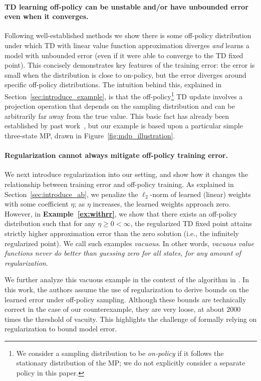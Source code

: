 \paragraph{TD learning off-policy can be unstable and/or have unbounded error even when it converges.}
Following well-established methods we show there is some off-policy distribution under which TD with linear value function approximation diverges \emph{and} learns a model with unbounded error (even if it were able to converge to the TD fixed point). This concisely demonstrates key features of the training error: the error is small when the distribution is close to on-policy, but the error diverges around specific off-policy distributions.  The intuition behind this, explained in Section~\ref{sec:introduce_example}, is that the off-policy\footnote{We consider a sampling distribution to be \emph{on-policy} if it follows the stationary distribution of the MP;  we do not explicitly consider a separate policy in this paper. } TD update involves a projection operation that depends on the sampling distribution and can be arbitrarily far away from the true value.  This basic fact has already been established by past work~\cite{baird1993counterexample,kolter2011fixed}, but our example is based upon a particular simple three-state MP, drawn in Figure~\ref{fig:mdp_illustration}.

\paragraph{Regularization cannot always mitigate off-policy training error. }
We next introduce regularization into our setting, and show how it changes the relationship between training error and off-policy training. As explained in Section~\ref{sec:introduce_ab}, we penalize the $\ell_2$-norm of learned (linear) weights with some coefficient $\eta$; as $\eta$ increases, the learned weights approach zero.  However, in \textbf{Example~\ref{ex:withrr}}, we show that there exists an off-policy distribution such that for any $\eta \geq 0 < \infty$, the regularized TD fixed point attains strictly higher approximation error than the zero solution (i.e., the infinitely regularized point).  We call such examples \emph{vacuous}. In other words, \emph{vacuous value functions never do better than guessing zero for all states, for any amount of regularization}.

We further analyze this vacuous example in the context of the algorithm in \citep{zhang2021breaking}. In this work, the authors assume the use of regularization to derive bounds on the learned error under off-policy sampling. Although these bounds are technically correct in the case of our counterexample, they are very loose, at about $2000$ times the threshold of vacuity.  This highlights the challenge of formally relying on regularization to bound model error.

